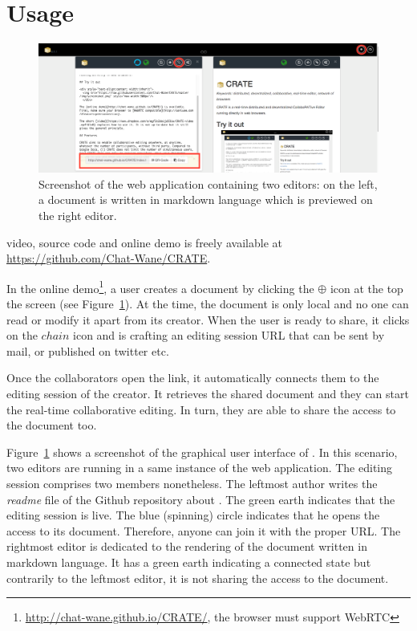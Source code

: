 
\section{Usage}
\label{sec:usage}

\begin{figure}
  \includegraphics[width=\textwidth]{./img/crate.png}
  \caption{\label{img:screenshot} Screenshot of the web application containing
    two editors: on the left, a document is written in markdown language which
    is previewed on the right editor.}
\end{figure}

\CRATE video, source code and online demo is freely available at
\url{https://github.com/Chat-Wane/CRATE}.


In the online demo\footnote{\url{http://chat-wane.github.io/CRATE/}, the browser
  must support WebRTC}, a user creates a document by clicking the $\oplus$ icon
at the top the screen (see Figure~\ref{img:screenshot}). At the time, the
document is only local and no one can read or modify it apart from its
creator. When the user is ready to share, it clicks on the $chain$ icon and
\CRATE is crafting an editing session URL that can be sent by mail, or published
on twitter etc.

Once the collaborators open the link, it automatically connects them
to the editing session of the creator. It retrieves the shared
document and they can start the real-time collaborative editing. In
turn, they are able to share the access to the document too. 

Figure~\ref{img:screenshot} shows a screenshot of the graphical user interface
of \CRATE. In this scenario, two editors are running in a same instance of the
web application. The editing session comprises two members nonetheless. The
leftmost author writes the \emph{readme} file of the Github repository about
\CRATE. The green earth indicates that the editing session is live. The blue
(spinning) circle indicates that he opens the access to its document. Therefore,
anyone can join it with the proper URL. The rightmost editor is dedicated to the
rendering of the document written in markdown language. It has a green earth
indicating a connected state but contrarily to the leftmost editor, it is not
sharing the access to the document.

